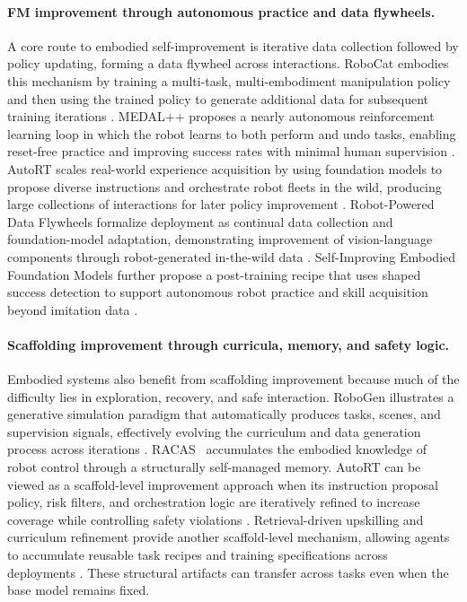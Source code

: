 \documentclass{article}
\begin{document}
\paragraph{FM improvement through autonomous practice and data flywheels.}
A core route to embodied self-improvement is iterative data collection followed by policy updating, forming a data flywheel across interactions. RoboCat embodies this mechanism by training a multi-task, multi-embodiment manipulation policy and then using the trained policy to generate additional data for subsequent training iterations \citep{bousmalis2023robocatselfimprovinggeneralistagent}. MEDAL++ proposes a nearly autonomous reinforcement learning loop in which the robot learns to both perform and undo tasks, enabling reset-free practice and improving success rates with minimal human supervision \citep{sharma2023selfimprovingrobotsendtoendautonomous}. AutoRT scales real-world experience acquisition by using foundation models to propose diverse instructions and orchestrate robot fleets in the wild, producing large collections of interactions for later policy improvement \citep{ahn2024autortembodiedfoundationmodels}. Robot-Powered Data Flywheels formalize deployment as continual data collection and foundation-model adaptation, demonstrating improvement of vision-language components through robot-generated in-the-wild data \citep{grannen2025robotpowereddataflywheelsdeploying}. Self-Improving Embodied Foundation Models further propose a post-training recipe that uses shaped success detection to support autonomous robot practice and skill acquisition beyond imitation data \citep{ghasemipour2025selfimproving}.

\paragraph{Scaffolding improvement through curricula, memory, and safety logic.}
Embodied systems also benefit from scaffolding improvement because much of the difficulty lies in exploration, recovery, and safe interaction. RoboGen illustrates a generative simulation paradigm that automatically produces tasks, scenes, and supervision signals, effectively evolving the curriculum and data generation process across iterations \citep{wang2024robogenunleashinginfinitedata}. RACAS~\citep{ashley2026racas} accumulates the embodied knowledge of robot control through a structurally self-managed memory.
AutoRT can be viewed as a scaffold-level improvement approach when its instruction proposal policy, risk filters, and orchestration logic are iteratively refined to increase coverage while controlling safety violations \citep{ahn2024autortembodiedfoundationmodels}. Retrieval-driven upskilling and curriculum refinement provide another scaffold-level mechanism, allowing agents to accumulate reusable task recipes and training specifications across deployments \citep{zhu2025auraautonomousupskillingretrievalaugmented}. These structural artifacts can transfer across tasks even when the base model remains fixed.
\end{document}
